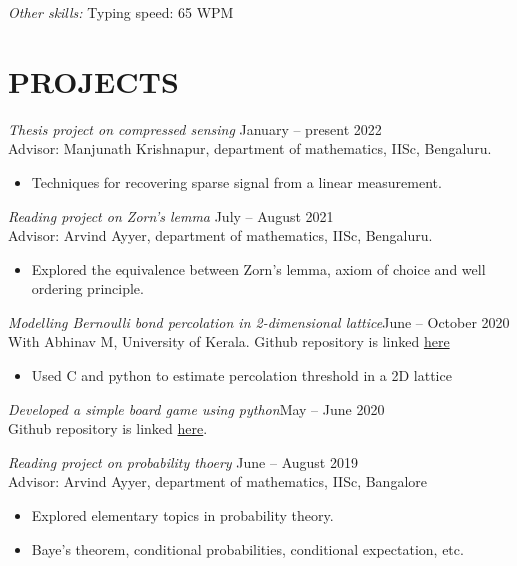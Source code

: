\documentclass[margin, 10pt]{res} %
\begin{document}
\begin{resume}
{\sl Other skills:} Typing speed: 65 WPM
 
 
\section{PROJECTS}

{\sl Thesis project on compressed sensing} \hfill  January -- present 2022\\
Advisor: Manjunath Krishnapur, department of mathematics, IISc, Bengaluru.
\begin{itemize} \itemsep -2pt
\item Techniques for recovering sparse signal from a linear measurement.
\end{itemize} 
\smallskip

{\sl Reading project on Zorn's lemma} \hfill July -- August 2021 \\
Advisor: Arvind Ayyer, department of mathematics, IISc, Bengaluru.
\begin{itemize} 
\item Explored the equivalence between Zorn's lemma, axiom of choice and well ordering principle.
\end{itemize} 
\smallskip

{\sl Modelling Bernoulli bond percolation in 2-dimensional lattice}\hfill June -- October 2020\\
	With Abhinav M, University of Kerala. Github repository is linked \href{https://github.com/AbhinavM2000/percolation_}{here}
\begin{itemize}
	\item Used C and python to estimate percolation threshold in a 2D lattice
\end{itemize}
\smallskip

{\sl Developed a simple board game using python}\hfill May -- June 2020\\
Github repository is linked \href{https://github.com/DhanusML/marble-and-hole-puzzle}{here}.
\smallskip

{\sl Reading project on probability thoery} \hfill June -- August 2019 \\
Advisor: Arvind Ayyer, department of mathematics, IISc, Bangalore
\begin{itemize} \itemsep -2pt %
\item Explored elementary topics in probability theory.
\item Baye's theorem, conditional probabilities, conditional expectation, etc.
\end{itemize}


\end{resume}
\end{document}
